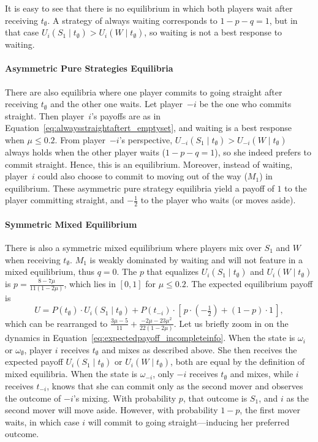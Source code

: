 \documentclass[main.tex]{subfiles}
\begin{document}
It is easy to see that there is no equilibrium in which both players wait after receiving $t_\emptyset$. A strategy of always waiting corresponds to $1-p-q=1$, but in that case $U_i(S_1 \mid t_\emptyset)> U_i(W \mid t_\emptyset)$, so waiting is not a best response to waiting.
\paragraph{Asymmetric Pure Strategies Equilibria}
There are also equilibria where one player commits to going straight after receiving $t_\emptyset$ and the other one waits. Let player~$-i$ be the one who commits straight. Then player~$i$'s payoffs are as in Equation~\ref{eq:alwaysstraightaftert_emptyset}, and waiting is a best response when $\mu \leq 0.2$. From player~$-i$'s perspective, $U_{-i}(S_1 \mid t_\emptyset) > U_{-i}(W \mid t_\emptyset)$ always holds when the other player waits ($1-p-q=1$), so she indeed prefers to commit straight. Hence, this is an equilibrium. Moreover, instead of waiting, player~$i$ could also choose to commit to moving out of the way ($M_1$) in equilibrium. These asymmetric pure strategy equilibria yield a payoff of $1$ to the player committing straight, and $-\tfrac{1}{2}$ to the player who waits (or moves aside).
\paragraph{Symmetric Mixed Equilibrium}
There is also a symmetric mixed equilibrium where players mix over $S_1$ and $W$ when receiving $t_\emptyset$. $M_1$ is weakly dominated by waiting and will not feature in a mixed equilibrium, thus $q=0$. The $p$ that equalizes $U_i(S_{1} \mid t_\emptyset)$ and $ U_i(W \mid t_\emptyset)$ is $p=\frac{8-7\mu}{11(1-2\mu)}$, which lies in $[0,1]$ for $\mu\leq0.2$. The expected equilibrium payoff is 
\begin{equation}
    U = P(t_\emptyset) \cdot U_i(S_1 \mid t_\emptyset)
      + P(t_{-i}) \cdot \left[\, p \cdot \left(-\tfrac{1}{2}\right) + (1 - p) \cdot 1 \,\right],
    \label{eq:expectedpayoff_incompleteinfo}
\end{equation}
which can be rearranged to $\frac{3\mu-5}{11}+\frac{-2\mu-23\mu^2}{22(1-2\mu)}$. Let us briefly zoom in on the dynamics in Equation~\ref{eq:expectedpayoff_incompleteinfo}. When the state is $\omega_i$ or $\omega_\emptyset$, player $i$ receives $t_\emptyset$ and mixes as described above. She then receives the expected payoff $U_i(S_1 \mid t_\emptyset)$ or $U_i(W \mid t_\emptyset)$, both are equal by the definition of mixed equilibria. 
When the state is $\omega_{-i}$, only $-i$ receives $t_\emptyset$ and mixes, while $i$ receives $t_{-i}$, knows that she can commit only as the second mover and observes the outcome of $-i$'s mixing. With probability $p$, that outcome is $S_1$, and $i$ as the second mover will move aside. However, with probability $1 - p$, the first mover waits, in which case $i$ will commit to going straight—inducing her preferred outcome.
\end{document}
